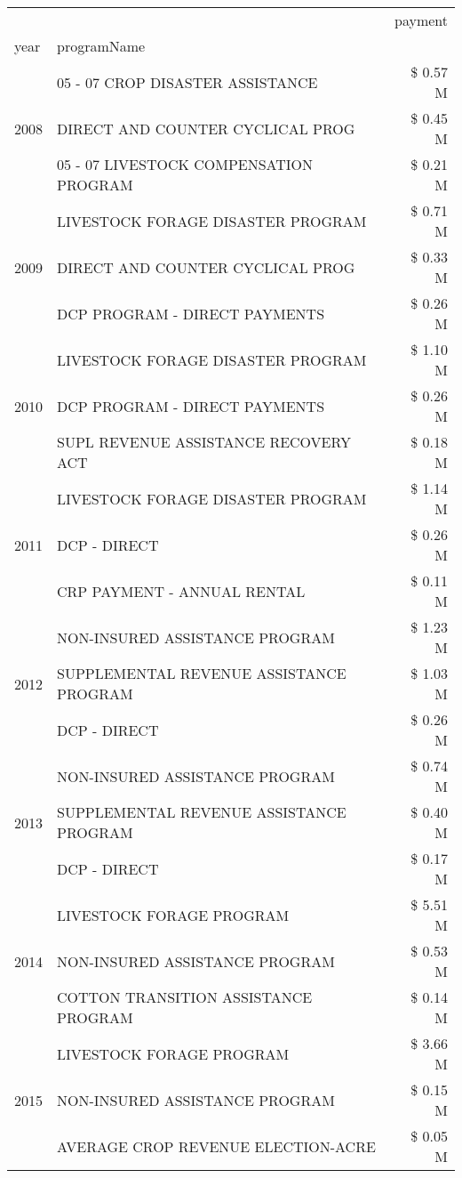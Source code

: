 \begin{tabular}{llr}
\toprule
 &  & payment \\
year & programName &  \\
\midrule
\multirow[t]{3}{*}{2008} & 05 - 07 CROP DISASTER ASSISTANCE & \$ 0.57 M \\
 & DIRECT AND COUNTER CYCLICAL PROG & \$ 0.45 M \\
 & 05 - 07 LIVESTOCK COMPENSATION PROGRAM & \$ 0.21 M \\
\cline{1-3}
\multirow[t]{3}{*}{2009} & LIVESTOCK FORAGE DISASTER  PROGRAM & \$ 0.71 M \\
 & DIRECT AND COUNTER CYCLICAL PROG & \$ 0.33 M \\
 & DCP PROGRAM - DIRECT PAYMENTS & \$ 0.26 M \\
\cline{1-3}
\multirow[t]{3}{*}{2010} & LIVESTOCK FORAGE DISASTER  PROGRAM & \$ 1.10 M \\
 & DCP PROGRAM - DIRECT PAYMENTS & \$ 0.26 M \\
 & SUPL REVENUE ASSISTANCE RECOVERY ACT & \$ 0.18 M \\
\cline{1-3}
\multirow[t]{3}{*}{2011} & LIVESTOCK FORAGE DISASTER PROGRAM & \$ 1.14 M \\
 & DCP - DIRECT & \$ 0.26 M \\
 & CRP PAYMENT - ANNUAL RENTAL & \$ 0.11 M \\
\cline{1-3}
\multirow[t]{3}{*}{2012} & NON-INSURED ASSISTANCE PROGRAM & \$ 1.23 M \\
 & SUPPLEMENTAL REVENUE ASSISTANCE PROGRAM & \$ 1.03 M \\
 & DCP - DIRECT & \$ 0.26 M \\
\cline{1-3}
\multirow[t]{3}{*}{2013} & NON-INSURED ASSISTANCE PROGRAM & \$ 0.74 M \\
 & SUPPLEMENTAL REVENUE ASSISTANCE PROGRAM & \$ 0.40 M \\
 & DCP - DIRECT & \$ 0.17 M \\
\cline{1-3}
\multirow[t]{3}{*}{2014} & LIVESTOCK FORAGE PROGRAM & \$ 5.51 M \\
 & NON-INSURED ASSISTANCE PROGRAM & \$ 0.53 M \\
 & COTTON TRANSITION ASSISTANCE PROGRAM & \$ 0.14 M \\
\cline{1-3}
\multirow[t]{3}{*}{2015} & LIVESTOCK FORAGE PROGRAM & \$ 3.66 M \\
 & NON-INSURED ASSISTANCE PROGRAM & \$ 0.15 M \\
 & AVERAGE CROP REVENUE ELECTION-ACRE & \$ 0.05 M \\

\end{tabular}
